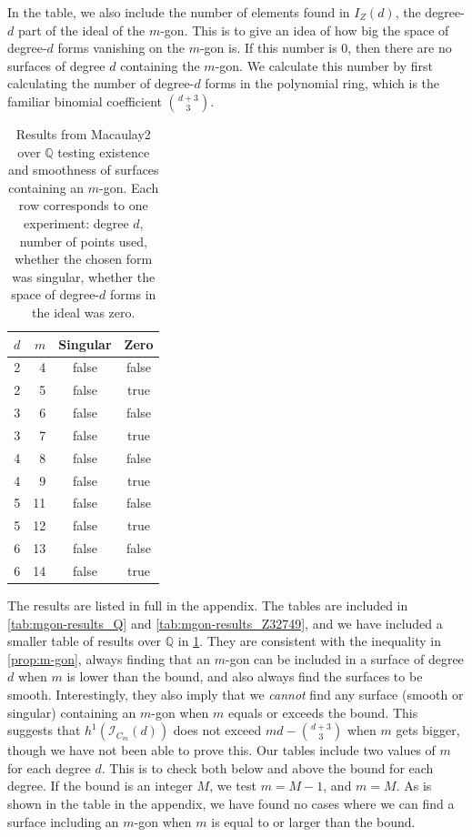 In the table, we also include the number of elements found in $I_Z(d)$, the degree-$d$ part of the ideal of the $m$-gon. This is to give an idea of how big the space of degree-$d$ forms vanishing on the $m$-gon is. If this number is 0, then there are no surfaces of degree $d$ containing the $m$-gon. We calculate this number by first calculating the number of degree-$d$ forms in the polynomial ring, which is the familiar binomial coefficient $\binom{d+3}{3}$. 

\begin{table}
    \centering
    \caption{Results from Macaulay2 over $\mathbb{Q}$ testing existence and smoothness of surfaces containing an $m$-gon. Each row corresponds to one experiment: degree $d$, number of points used, whether the chosen form was singular, whether the space of degree-$d$ forms in the ideal was zero.}
    \label{tab:mgon-results-small}
    \small
    \begin{tabular}{r r c c }
        \toprule
        $d$ & $m$ & Singular & Zero  \\
        \midrule
        2 & 4  & false & false \\
        2 & 5  & false & true  \\
        3 & 6  & false & false \\
        3 & 7  & false & true  \\
        4 & 8  & false & false \\
        4 & 9  & false & true  \\
        5 & 11 & false & false \\
        5 & 12 & false & true  \\
        6 & 13 & false & false \\
        6 & 14 & false & true  \\
        \bottomrule
    \end{tabular}
\end{table}

The results are listed in full in the appendix. The tables are included in \cref{tab:mgon-results_Q} and \cref{tab:mgon-results_Z32749}, and we have included a smaller table of results over $\mathbb{Q}$ in \cref{tab:mgon-results-small}. They are consistent with the inequality in \cref{prop:m-gon}, always finding that an $m$-gon can be included in a surface of degree $d$ when $m$ is lower than the bound, and also always find the surfaces to be smooth. Interestingly, they also imply that we \emph{cannot} find any surface (smooth or singular) containing an $m$-gon when $m$ equals or exceeds the bound. This suggests that $h^1(\mathcal{I}_{C_m}(d))$ does not exceed $md-\binom{d+3}{3}$ when $m$ gets bigger, though we have not been able to prove this. Our tables include two values of $m$ for each degree $d$. This is to check both below and above the bound for each degree. If the bound is an integer $M$, we test $m=M-1$, and $m=M$. As is shown in the table in the appendix, we have found no cases where we can find a surface including an $m$-gon when $m$ is equal to or larger than the bound.



